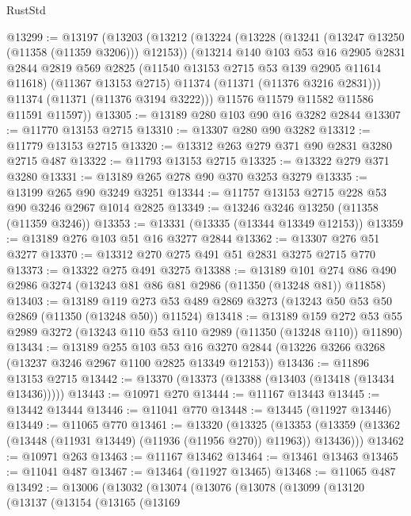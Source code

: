 \begin{lexlean}{RustStd}
\begin{coremodule}
{\begin{coremodule}
{{{{{{{{{{{{{{{{{{{{{{{{{{{{{{{{{@13299 := @13197
    (@13203
      (@13212
        (@13224
          (@13228 (@13241 (@13247 @13250 (@11358 (@11359 @3206))) @12153))
          (@13214
            @140
            @103
            @53
            @16
            @2905
            @2831
            @2844
            @2819
            @569
            @2825
            (@11540 @13153 @2715 @53 @139 @2905 @11614 @11618)
            (@11367 @13153 @2715)
            @11374
            (@11371 (@11376 @3216 @2831)))
          @11374
          (@11371 (@11376 @3194 @3222)))
        @11576
        @11579
        @11582
        @11586
        @11591
        @11597))
@13305 := @13189 @280 @103 @90 @16 @3282 @2844
@13307 := @11770 @13153 @2715
@13310 := @13307 @280 @90 @3282
@13312 := @11779 @13153 @2715
@13320 := @13312 @263 @279 @371 @90 @2831 @3280 @2715 @487
@13322 := @11793 @13153 @2715
@13325 := @13322 @279 @371 @3280
@13331 := @13189 @265 @278 @90 @370 @3253 @3279
@13335 := @13199 @265 @90 @3249 @3251
@13344 := @11757 @13153 @2715 @228 @53 @90 @3246 @2967 @1014 @2825
@13349 := @13246 @3246 @13250 (@11358 (@11359 @3246))
@13353 := @13331 (@13335 (@13344 @13349 @12153))
@13359 := @13189 @276 @103 @51 @16 @3277 @2844
@13362 := @13307 @276 @51 @3277
@13370 := @13312 @270 @275 @491 @51 @2831 @3275 @2715 @770
@13373 := @13322 @275 @491 @3275
@13388 := @13189
    @101
    @274
    @86
    @490
    @2986
    @3274
    (@13243 @81 @86 @81 @2986 (@11350 (@13248 @81)) @11858)
@13403 := @13189
    @119
    @273
    @53
    @489
    @2869
    @3273
    (@13243 @50 @53 @50 @2869 (@11350 (@13248 @50)) @11524)
@13418 := @13189
    @159
    @272
    @53
    @55
    @2989
    @3272
    (@13243 @110 @53 @110 @2989 (@11350 (@13248 @110)) @11890)
@13434 := @13189
    @255
    @103
    @53
    @16
    @3270
    @2844
    (@13226 @3266 @3268 (@13237 @3246 @2967 @1100 @2825 @13349 @12153))
@13436 := @11896 @13153 @2715
@13442 := @13370 (@13373 (@13388 (@13403 (@13418 (@13434 @13436)))))
@13443 := @10971 @270
@13444 := @11167 @13443
@13445 := @13442 @13444
@13446 := @11041 @770
@13448 := @13445 (@11927 @13446)
@13449 := @11065 @770
@13461 := @13320
    (@13325
      (@13353 (@13359 (@13362 (@13448 (@11931 @13449) (@11936 (@11956 @270)) @11963)) @13436)))
@13462 := @10971 @263
@13463 := @11167 @13462
@13464 := @13461 @13463
@13465 := @11041 @487
@13467 := @13464 (@11927 @13465)
@13468 := @11065 @487
@13492 := @13006
    (@13032
      (@13074
        (@13076
          (@13078
            (@13099
              (@13120
                (@13137
                  (@13154
                    (@13165
                      (@13169
}}}}}}}}}}}}}}}}}}}}}}}}}}}}}}}}}
\end{coremodule}}
\end{coremodule}
\end{lexlean}
